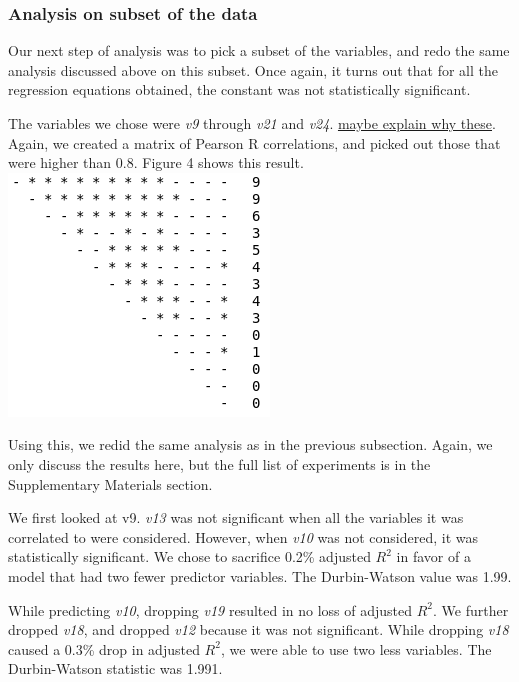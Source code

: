 \documentclass[12pt,a4paper,twocolumn]{article}
\begin{document}
\subsubsection{Analysis on subset of the data}
Our next step of analysis was to pick a subset of the variables, and redo the same analysis discussed above on this subset. Once again, it turns out that for all the regression equations obtained, the constant was not statistically significant.

The variables we chose were \textit{v9} through \textit{v21} and \textit{v24}. \underline{maybe explain why these}. Again, we created a matrix of Pearson R correlations, and picked out those that were higher than 0.8. Figure 4 shows this result. \\

\includegraphics[scale=0.6]{fig4.png}
\begingroup
{}
\endgroup
\hfill\break

Using this, we redid the same analysis as in the previous subsection. Again, we only discuss the results here, but the full list of experiments is in the Supplementary Materials section.

We first looked at v9. \textit{v13} was not significant when all the variables it was correlated to were considered. However, when \textit{v10} was not considered, it was statistically significant. We chose to sacrifice 0.2\% adjusted $R^2$ in favor of a model that had two fewer predictor variables. The Durbin-Watson value was 1.99.

While predicting \textit{v10}, dropping \textit{v19} resulted in no loss of adjusted $R^2$. We further dropped \textit{v18}, and dropped \textit{v12} because it was not significant. While dropping \textit{v18} caused a 0.3\% drop in adjusted $R^2$, we were able to use two less variables. The Durbin-Watson statistic was 1.991.
\end{document}
